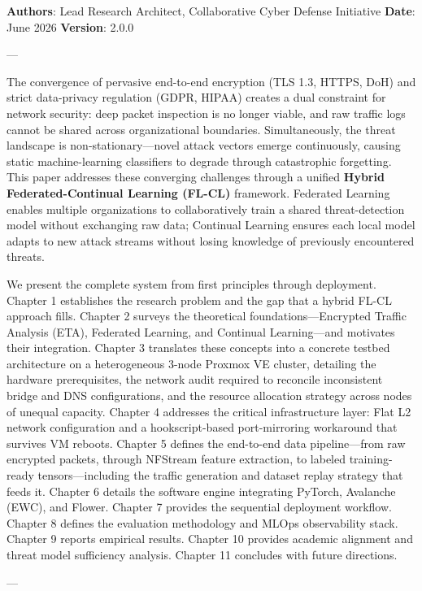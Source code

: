 \documentclass[conference]{IEEEtran}
\begin{document}
\textbf{Authors}: Lead Research Architect, Collaborative Cyber Defense Initiative
\textbf{Date}: June 2026
\textbf{Version}: 2.0.0

---


The convergence of pervasive end-to-end encryption (TLS 1.3, HTTPS, DoH) and strict data-privacy regulation (GDPR, HIPAA) creates a dual constraint for network security: deep packet inspection is no longer viable, and raw traffic logs cannot be shared across organizational boundaries. Simultaneously, the threat landscape is non-stationary—novel attack vectors emerge continuously, causing static machine-learning classifiers to degrade through catastrophic forgetting. This paper addresses these converging challenges through a unified \textbf{Hybrid Federated-Continual Learning (FL-CL)} framework. Federated Learning enables multiple organizations to collaboratively train a shared threat-detection model without exchanging raw data; Continual Learning ensures each local model adapts to new attack streams without losing knowledge of previously encountered threats.

We present the complete system from first principles through deployment. Chapter 1 establishes the research problem and the gap that a hybrid FL-CL approach fills. Chapter 2 surveys the theoretical foundations—Encrypted Traffic Analysis (ETA), Federated Learning, and Continual Learning—and motivates their integration. Chapter 3 translates these concepts into a concrete testbed architecture on a heterogeneous 3-node Proxmox VE cluster, detailing the hardware prerequisites, the network audit required to reconcile inconsistent bridge and DNS configurations, and the resource allocation strategy across nodes of unequal capacity. Chapter 4 addresses the critical infrastructure layer: Flat L2 network configuration and a hookscript-based port-mirroring workaround that survives VM reboots. Chapter 5 defines the end-to-end data pipeline—from raw encrypted packets, through NFStream feature extraction, to labeled training-ready tensors—including the traffic generation and dataset replay strategy that feeds it. Chapter 6 details the software engine integrating PyTorch, Avalanche (EWC), and Flower. Chapter 7 provides the sequential deployment workflow. Chapter 8 defines the evaluation methodology and MLOps observability stack. Chapter 9 reports empirical results. Chapter 10 provides academic alignment and threat model sufficiency analysis. Chapter 11 concludes with future directions.

---
\end{document}
